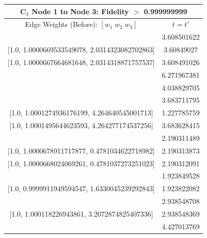 \documentclass[reprint, aps, 12pt, floatfix]{revtex4-2}
\begin{document}
\begin{center}
    \begin{tabular}{||c c||}
        \multicolumn{2}{c}{C$_3$ Node 1 to Node 3: Fidelity $>$ 0.999999999}\\
        \hline
        Edge Weights (Before): $[w_1 \; w_2 \; w_3]$&$t=t'$\\
        \hline
        [1.0, 1.0000627779323967, 2.031426058335637]&3.608501622\\

        [1.0, 1.0000669533549078, 2.0314323082702863]&3.60849027\\

        [1.0, 1.0000667664681648, 2.0314318871757537]&3.608491026\\
        \hline
        [1.0, 1.0001094131525905, 2.8383986986304652]&6.271967381\\
        \hline
        [1.0, 0.9999915036797877, 1.296416251389392]&4.038829705\\
        \hline
        [1.0, 1.0001342865757132, 4.264250107353341]&3.683711795\\

        [1.0, 1.0001274936176199, 4.264640545001713]&1.227785759\\

        [1.0, 1.0001495644623593, 4.264277174537256]&3.683628415\\
        \hline
        [1.0, 1.0000672571444604, 0.4781038628347857]&2.190311489\\

        [1.0, 1.0000678911717877, 0.4781034622718982]&2.190313873\\

        [1.0, 1.0000668024069261, 0.4781037273251023]&2.190312091\\
        \hline
        [1.0, 0.999999129841404, 1.6329609390345385]&1.923849528\\

        [1.0, 0.9999911949594547, 1.6330045239292843]&1.923822082\\
        \hline
        [1.0, 1.0001168600232988, 3.2072873608895]&2.938548708\\

        [1.0, 1.000118226943861, 3.2072874825407336]&2.938548369\\
        \hline
        [1.0, 1.000177767159788, 0.23654767723475098]&4.427013769\\
        \hline
    \end{tabular}
\end{center}
\end{document}
